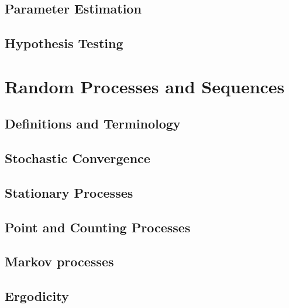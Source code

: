 \documentclass{amro-notes}
\begin{document}
\chapter{Parameter Estimation}


\chapter{Hypothesis Testing}


\part{Random Processes and Sequences}
\chapter{Definitions and Terminology}


\chapter{Stochastic Convergence}


\chapter{Stationary Processes}


\chapter{Point and Counting Processes}


\chapter{Markov processes}


\chapter{Ergodicity}


\begin{appendices}
  
\end{appendices}


\printbibliography


\printindex
\end{document}
